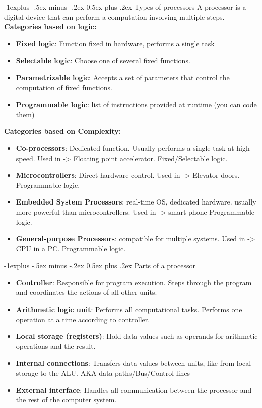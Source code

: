 \documentclass[letterpaper, 8pt]{extarticle}
\makeatletter
\renewcommand{\subsection}{\@startsection{subsection}{2}{0mm}%
                                {-1explus -.5ex minus -.2ex}%
                                {0.5ex plus .2ex}%
                                {\normalfont\small\bfseries}}
\makeatother
\begin{document}
\begin{multicols*}{6}
\subsection{Types of processors}
A processor is a digital device that can perform a computation involving multiple steps. \\
\textbf{Categories based on logic:} \\
\begin{itemize}
    \item \textbf{Fixed logic}: Function fixed in hardware, performs a single task
    \item \textbf{Selectable logic}: Choose one of several fixed functions.
    \item \textbf{Parametrizable logic}: Accepts a set of parameters that control the computation of fixed functions.
    \item \textbf{Programmable logic}: list of instructions provided at runtime (you can code them)
\end{itemize}

\textbf{Categories based on Complexity:} \\
\begin{itemize}
    \item \textbf{Co-processors}: Dedicated function. Usually performs a single task at high speed. Used in -> Floating point accelerator. Fixed/Selectable logic.
    \item \textbf{Microcontrollers}: Direct hardware control. Used in -> Elevator doors. Programmable logic.
    \item \textbf{Embedded System Processors}: real-time OS, dedicated hardware. usually more powerful than microcontrollers. Used in -> smart phone Programmable logic.
    \item \textbf{General-purpose Processors}: compatible for multiple systems. Used in -> CPU in a PC. Programmable logic.
\end{itemize}

\subsection{Parts of a processor}
\begin{itemize}
    \item \textbf{Controller}: Responsible for program execution. Steps through the program and coordinates the actions of all other units.
    \item \textbf{Arithmetic logic unit}: Performs all computational tasks. Performs one operation at a time according to controller.
    \item \textbf{Local storage (registers)}: Hold data values such as operands for arithmetic operations and the result.
    \item \textbf{Internal connections}: Transfers data values between units, like from local storage to the ALU. AKA data paths/Bus/Control lines
    \item \textbf{External interface}: Handles all communication between the processor and the rest of the computer system.
\end{itemize}


\end{multicols*}
\end{document}
